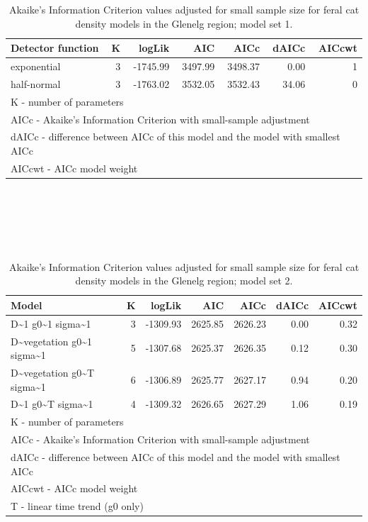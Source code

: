 \documentclass[11pt,a4paper,titlepage,twoside,openright]{style/unimelbthesis}
\begin{document}
\begin{mainmatter}
\begingroup\fontsize{10}{12}\selectfont
\begin{longtable}[t]{lrrrrrr}
\caption{\label{tab:density-aic-g-1}Akaike's Information Criterion values adjusted for small sample size for feral cat density models in the Glenelg region; model set 1.}\\
\toprule
Detector function & K & logLik & AIC & AICc & dAICc & AICcwt\\
\midrule
exponential & 3 & -1745.99 & 3497.99 & 3498.37 & 0.00 & 1\\
half-normal & 3 & -1763.02 & 3532.05 & 3532.43 & 34.06 & 0\\
\bottomrule
\multicolumn{7}{l}{\rule{0pt}{1em}K - number of parameters}\\
\multicolumn{7}{l}{\rule{0pt}{1em}AICc - Akaike's Information Criterion with small-sample adjustment}\\
\multicolumn{7}{l}{\rule{0pt}{1em}dAICc - difference between AICc of this model and the model with smallest AICc}\\
\multicolumn{7}{l}{\rule{0pt}{1em}AICcwt - AICc model weight}\\
\end{longtable}
\endgroup{}

\newpage

\(~\)

\(~\)

\(~\)

\begingroup\fontsize{10}{12}\selectfont
\begin{longtable}[t]{lrrrrrr}
\caption{\label{tab:density-aic-g-2}Akaike's Information Criterion values adjusted for small sample size for feral cat density models in the Glenelg region; model set 2.}\\
\toprule
Model & K & logLik & AIC & AICc & dAICc & AICcwt\\
\midrule
D\textasciitilde{}1 g0\textasciitilde{}1 sigma\textasciitilde{}1 & 3 & -1309.93 & 2625.85 & 2626.23 & 0.00 & 0.32\\
D\textasciitilde{}vegetation g0\textasciitilde{}1 sigma\textasciitilde{}1 & 5 & -1307.68 & 2625.37 & 2626.35 & 0.12 & 0.30\\
D\textasciitilde{}vegetation g0\textasciitilde{}T sigma\textasciitilde{}1 & 6 & -1306.89 & 2625.77 & 2627.17 & 0.94 & 0.20\\
D\textasciitilde{}1 g0\textasciitilde{}T sigma\textasciitilde{}1 & 4 & -1309.32 & 2626.65 & 2627.29 & 1.06 & 0.19\\
\bottomrule
\multicolumn{7}{l}{\rule{0pt}{1em}K - number of parameters}\\
\multicolumn{7}{l}{\rule{0pt}{1em}AICc - Akaike's Information Criterion with small-sample adjustment}\\
\multicolumn{7}{l}{\rule{0pt}{1em}dAICc - difference between AICc of this model and the model with smallest AICc}\\
\multicolumn{7}{l}{\rule{0pt}{1em}AICcwt - AICc model weight}\\
\multicolumn{7}{l}{\rule{0pt}{1em}T - linear time trend (g0 only)}\\
\end{longtable}
\endgroup{}


\end{mainmatter}
\end{document}
